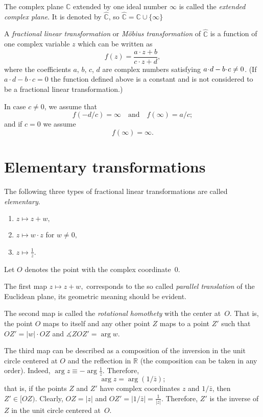 The complex plane $\mathbb{C}$ extended by one ideal number $\infty$ 
is called the \emph{extended complex plane}.
It is denoted by $\hat{\mathbb{C}}$, so $\hat{\mathbb{C}}=\mathbb{C}\cup\{\infty\}$

A \emph{fractional linear transformation} or \emph{M\"obius transformation} of  $\hat{\mathbb{C}}$ is a function of one complex variable $z$
which can be written as
$$f(z) = \frac{a\cdot z + b}{c\cdot z + d},$$
where the coefficients $a$, $b$, $c$, $d$ are complex numbers satisfying $a\cdot d \z- b\cdot c \not= 0$.
(If $a\cdot d - b\cdot c = 0$ the function defined above is a constant and is not considered to be a fractional linear transformation.) 

In case $c\not=0$, we assume that
$$f(-d/c) = \infty
\quad
\text{and}
\quad
f(\infty) = a/c;$$
and if $c=0$ we assume
$$f(\infty) = \infty.$$





\section*{Elementary transformations}

The following three types of fractional linear transformations are called \emph{elementary}.

\begin{enumerate}
\item $z\mapsto z+w,$
\item $z\mapsto w\cdot z$ for $w\ne0,$
\item $z\mapsto \frac1z.$
\end{enumerate}
 
Let $O$ denotes the point with the complex coordinate~$0$.

The first map $z\mapsto z+w,$ corresponds to the so called 
\emph{parallel translation} 
of the Euclidean plane, its geometric meaning should be evident.

The second map is called the \emph{rotational homothety} with the center at~$O$.
That is, the point $O$ maps to itself
and any other point $Z$ maps to a point $Z'$ such that $OZ'=|w|\cdot OZ$ and $\measuredangle ZOZ'=\arg w$.

The third map can be described as a composition of the inversion in the unit circle centered at $O$ and the reflection in $\mathbb{R}$ 
(the composition can be taken in any order).
Indeed, $\arg z\equiv -\arg \tfrac1z$.
Therefore, 
$$\arg z=\arg (1/\bar z);$$
that is, if the points $Z$ and $Z'$ have complex coordinates $z$ and $1/\bar z$,
then $Z'\in[OZ)$.
Clearly, $OZ=|z|$ and $OZ'=|1/\bar z|=\tfrac{1}{|z|}$.
Therefore, $Z'$ is the inverse of $Z$ in the unit circle centered at~$O$.

